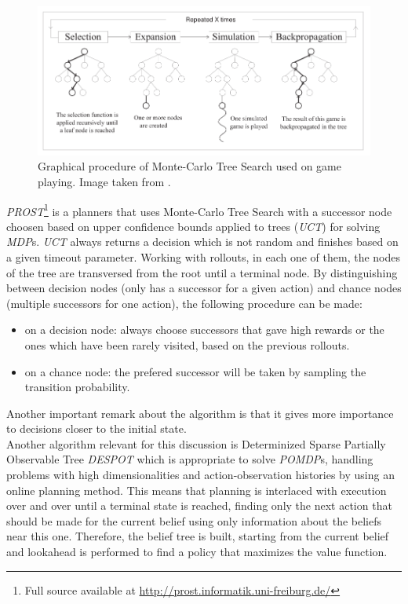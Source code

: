 \begin{figure}[H]
    \centering
        \includegraphics[width=14cm]{images/monte_carlo}
        \caption{Graphical procedure of Monte-Carlo Tree Search used on game
        playing. Image taken
        from \cite{Chaslot2008}. }
        \label{fig:monte_c}
\end{figure}

\textit{PROST}\footnote{Full source available at
\url{http://prost.informatik.uni-freiburg.de/}} is a planners that
uses Monte-Carlo Tree Search with a successor node choosen based on upper
confidence bounds applied to trees (\textit{UCT}) for solving \textit{MDP}s.
\textit{UCT} always returns a decision which is not random and finishes based on
a given timeout parameter.
Working with rollouts, in each one of them, the nodes of the tree are
transversed from the root until a terminal node. By distinguishing between
decision nodes (only has a successor for a given action) and chance nodes
(multiple successors for one action), the following procedure can be made:
\begin{itemize}
    \item on a decision node: always choose successors that gave high rewards or
    the ones which have been rarely visited, based on the previous rollouts.
    \item on a chance node: the prefered successor will be taken by sampling the
    transition probability.
\end{itemize}
Another important remark about the algorithm is that it gives more importance to
decisions closer to the initial state.\\


Another algorithm relevant for this discussion is Determinized Sparse Partially
Observable Tree \cite{Somani2013} \textit{DESPOT} which is appropriate to solve
\textit{POMDP}s, handling problems with high dimensionalities and
action-observation histories by using an online planning method. This means that
planning is interlaced with execution over and over until a terminal state is
reached, finding only the next action that should be made for the current
belief using only information about the beliefs near this one. Therefore, the
belief tree is built, starting from the current belief and lookahead is
performed to find a policy that maximizes the value function.


